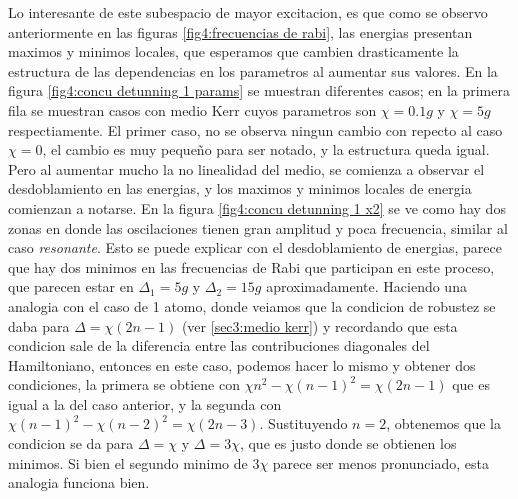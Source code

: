 Lo interesante de este subespacio de mayor excitacion, es que como se observo anteriormente en las figuras \ref{fig4:frecuencias de rabi}, las energias presentan maximos y minimos locales, que esperamos que cambien drasticamente la estructura de las dependencias en los parametros al aumentar sus valores. En la figura \ref{fig4:concu detunning 1 params} se muestran diferentes casos; en la primera fila se muestran casos con medio Kerr cuyos parametros son $\chi=0.1g$ y $\chi=5g$ respectiamente. El primer caso, no se observa ningun cambio con repecto al caso $\chi=0$, el cambio es muy pequeño para ser notado, y la estructura queda igual. Pero al aumentar mucho la no linealidad del medio, se comienza a observar el desdoblamiento en las energias, y los maximos y minimos locales de energia comienzan a notarse. En la figura \ref{fig4:concu detunning 1 x2} se ve como hay dos zonas en donde las oscilaciones tienen gran amplitud y poca frecuencia, similar al caso \textit{resonante}. Esto se puede explicar con el desdoblamiento de energias, parece que hay dos minimos en las frecuencias de Rabi que participan en este proceso, que parecen estar en $\Delta_1=5g$ y $\Delta_2=15g$ aproximadamente. Haciendo una analogia con el caso de 1 atomo, donde veiamos que la condicion de robustez se daba para $\Delta=\chi(2n-1)$ (ver \ref{sec3:medio kerr}) y recordando que esta condicion sale de la diferencia entre las contribuciones diagonales del Hamiltoniano, entonces en este caso, podemos hacer lo mismo y obtener dos condiciones, la primera se obtiene con $\chi n^2-\chi(n-1)^2=\chi(2n-1)$ que es igual a la del caso anterior, y la segunda con $\chi(n-1)^2-\chi(n-2)^2=\chi(2n-3)$. Sustituyendo $n=2$, obtenemos que la condicion se da para $\Delta=\chi$ y $\Delta=3\chi$, que es justo donde se obtienen los minimos. Si bien el segundo minimo de $3\chi$ parece ser menos pronunciado, esta analogia funciona bien.
